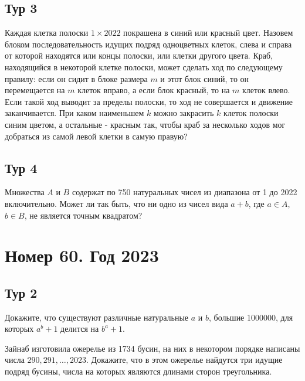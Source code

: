 \documentclass[11pt, a4paper]{common/document_template}
\begin{document}
\section{Тур 3}

\begin{exercise}
Каждая клетка полоски $1 \times 2022$ покрашена в синий или красный цвет. Назовем блоком последовательность идущих подряд одноцветных клеток, слева и справа от которой находятся или концы полоски, или клетки другого цвета. Краб, находящийся в некоторой клетке полоски, может сделать ход по следующему правилу: если он сидит в блоке размера $m$ и этот блок синий, то он перемещается на $m$ клеток вправо, а если блок красный, то на $m$ клеток влево. Если такой ход выводит за пределы полоски, то ход не совершается и движение заканчивается. При каком наименьшем $k$ можно закрасить $k$ клеток полоски синим цветом, а остальные - красным так, чтобы краб за несколько ходов мог добраться из самой левой клетки
в самую правую?
\end{exercise}


\section{Тур 4}

\begin{exercise}
Множества $A$ и $B$ содержат по 750 натуральных чисел из диапазона от 1 до 2022 включительно. Может ли так быть, что ни одно из чисел вида $a + b$, где $a \in A$, $b \in B$, не является точным квадратом? 
\end{exercise}


\chapter{Номер 60. Год 2023}

\section{Тур 2}

\begin{exercise}
Докажите, что существуют различные натуральные $a$ и $b$, большие 1000000, для которых $a^{b} + 1$ делится на $b^{a} + 1$.
\end{exercise}

\begin{exercise}
Зайнаб изготовила ожерелье из 1734 бусин, на них в некотором порядке написаны числа $290, 291, \dots, 2023$. Докажите, что в этом ожерелье найдутся три идущие подряд бусины, числа на которых являются длинами сторон треугольника.
\end{exercise}
\end{document}
